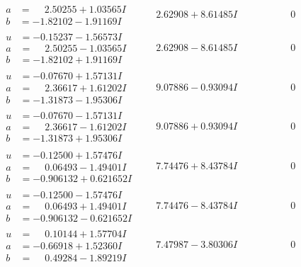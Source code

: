 \documentclass[1p]{elsarticle_modified}
\theoremstyle{definition}
\begin{document}
$$\begin{array}{c|c|c}
\begin{aligned}
a &= \phantom{-}2.50255 + 1.03565 I \\
b &= -1.82102 - 1.91169 I\end{aligned}
 & \phantom{-}2.62908 + 8.61485 I & \phantom{-0.000000 } 0 \\ \hline\begin{aligned}
u &= -0.15237 - 1.56573 I \\
a &= \phantom{-}2.50255 - 1.03565 I \\
b &= -1.82102 + 1.91169 I\end{aligned}
 & \phantom{-}2.62908 - 8.61485 I & \phantom{-0.000000 } 0 \\ \hline\begin{aligned}
u &= -0.07670 + 1.57131 I \\
a &= \phantom{-}2.36617 + 1.61202 I \\
b &= -1.31873 - 1.95306 I\end{aligned}
 & \phantom{-}9.07886 - 0.93094 I & \phantom{-0.000000 } 0 \\ \hline\begin{aligned}
u &= -0.07670 - 1.57131 I \\
a &= \phantom{-}2.36617 - 1.61202 I \\
b &= -1.31873 + 1.95306 I\end{aligned}
 & \phantom{-}9.07886 + 0.93094 I & \phantom{-0.000000 } 0 \\ \hline\begin{aligned}
u &= -0.12500 + 1.57476 I \\
a &= \phantom{-}0.06493 - 1.49401 I \\
b &= -0.906132 + 0.621652 I\end{aligned}
 & \phantom{-}7.74476 + 8.43784 I & \phantom{-0.000000 } 0 \\ \hline\begin{aligned}
u &= -0.12500 - 1.57476 I \\
a &= \phantom{-}0.06493 + 1.49401 I \\
b &= -0.906132 - 0.621652 I\end{aligned}
 & \phantom{-}7.74476 - 8.43784 I & \phantom{-0.000000 } 0 \\ \hline\begin{aligned}
u &= \phantom{-}0.10144 + 1.57704 I \\
a &= -0.66918 + 1.52360 I \\
b &= \phantom{-}0.49284 - 1.89219 I\end{aligned}
 & \phantom{-}7.47987 - 3.80306 I & \phantom{-0.000000 } 0 \\ \hline\begin{aligned}

\end{aligned}
\end{array}$$
\end{document}
